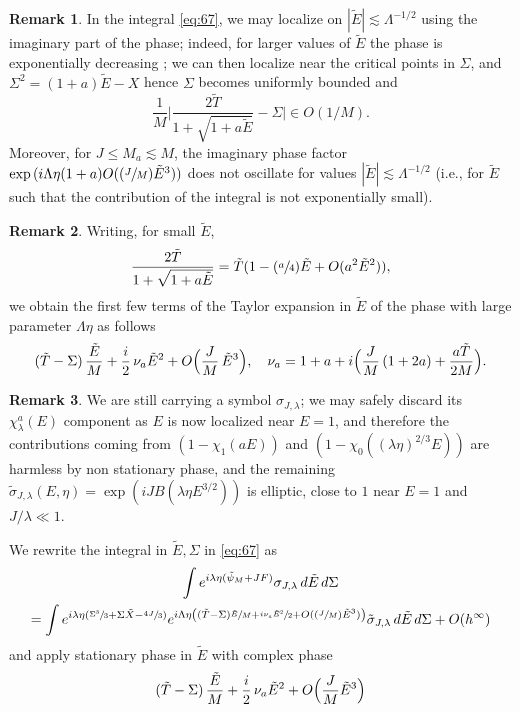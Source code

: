 \documentclass[11pt]{article}
\newcommand{\ie}{i.e.,\xspace}
\newcommand{\Psfrac}[2]{(\sfrac{#1}{#2})}
\theoremstyle{plain}
\theoremstyle{definition}
\newtheorem{rmq}{Remark}[section]
\begin{document}
\begin{rmq}\label{rmkimagphase}
In the integral \eqref{eq:67}, we may localize on $|{\tilde E}|\lesssim\Lambda^{-1/2}$ using the imaginary part of the phase; indeed, for larger values of ${\tilde E}$ the phase is exponentially decreasing ; we can then localize near the critical points in $\Sigma$, and $\Sigma^{2}=(1+a){\tilde E}-X$ hence $\Sigma$ becomes uniformly bounded and
\[
\frac 1M\biggl|\frac{2\tilde T}{1+\sqrt{1+a{\tilde E}}}-\Sigma\biggr| \in O(1/M).
\]
Moreover, for $J\leq M_a\lesssim M$, the imaginary phase factor $\exp{(i\Lambda\eta(1+a)O(\Psfrac JM {\tilde E}^3)})$ does not oscillate for values $|{\tilde E}|\lesssim \Lambda^{-1/2}$ (\ie for ${\tilde E}$ such that the contribution of the integral is not exponentially small).
\end{rmq}
\begin{rmq}
Writing, for small ${\tilde E}$,
\[
\frac{2\tilde T}{1+\sqrt{1+a{\tilde E}}}= \tilde T(1-\Psfrac a4 {\tilde E}+O(a^2{\tilde E}^2)),
\]
we obtain the first few terms of the Taylor expansion in $\tilde E$ of the phase with large parameter $\Lambda \eta$ as follows
\[
(\tilde T-\Sigma)\,\frac {\tilde E}M+\frac i2\, \nu_a {\tilde E}^2+O\Bigl(\frac JM\, {\tilde E}^3\Bigl),\quad \nu_a=1+a+i \Bigl(\frac JM\,(1+2a)+\frac{a \tilde T}{2M}\Bigr).
\]
\end{rmq}
\begin{rmq}
We are still carrying a symbol $\sigma_{J,\lambda}$; we may safely discard its $\chi_{\lambda}^{a}(E)$ component as $E$ is now localized near $E=1$, and therefore the contributions coming from $(1-\chi_{1}(aE))$ and $(1-\chi_0((\lambda\eta)^{2/3}E))$ are harmless by non stationary phase, and the remaining $\tilde \sigma_{J,\lambda}(E,\eta)=\exp(i J B(\lambda \eta E^{3/2}))$ is elliptic, close to $1$ near $E=1$ and $J/\lambda \ll 1$.
\end{rmq}
We rewrite the integral in ${\tilde E},\Sigma$ in \eqref{eq:67} as
\begin{multline*}
\int e^{i \lambda\eta (\tilde\psi_{M}+JF)} \sigma_{J,\lambda}\,d{\tilde E} \,d\Sigma\\ = \int e^{i \lambda\eta (\sfrac{\Sigma^3}{3}+\Sigma \tilde X-\sfrac{4J}{3})} e^{i \Lambda \eta \left((\tilde T-\Sigma) \sfrac {\tilde E} M + \sfrac{i\nu_a {\tilde E}^{2}}{2}+O(\Psfrac J M {\tilde E}^{3})\right)}  \tilde \sigma_{J,\lambda }\,d{\tilde E} \,d\Sigma +O(h^{\infty})
\end{multline*}
and apply stationary phase in ${\tilde E}$ with complex phase
\[
(\tilde T-\Sigma)\, \frac {\tilde E} M + \frac i2\, \nu_a {\tilde E}^{2}+O\Bigl(\frac J M {\tilde E}^{3}\Bigr)
\]
\end{document}

